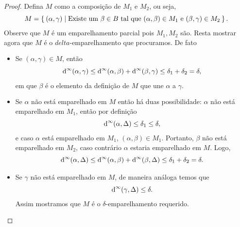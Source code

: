 \begin{proof}
    Defina $M$ como a composição de $M_1$ e $M_2$, ou seja,
    \begin{equation*}
        M = \Set{(\alpha, \gamma) | \text{Existe um } \beta \in B \text{ tal que }
        (\alpha, \beta) \in M_1 \text{ e } (\beta, \gamma) \in M_2}.
    \end{equation*}
    Observe que $M$ é um emparelhamento parcial pois $M_1, M_2$ são. Resta 
    mostrar agora que $M$ é o $delta$-emparelhamento que procuramos. De fato
    \begin{itemize}
        \item Se $(\alpha, \gamma) \in M$, então
        \begin{equation*}
            \text{d}^\infty(\alpha, \gamma) \leq \text{d}^\infty(\alpha, \beta) + \text{d}^\infty(\beta, \gamma) 
            \leq \delta_1 + \delta_2 = \delta,
        \end{equation*}
        em que $\beta$ é o elemento da definição de $M$ que une $\alpha$ a $\gamma$. 
        \item Se $\alpha$ não está emparelhado em $M$ então há duas possibilidade:
        $\alpha$ não está emparelhado em $M_1$, então por definição
        \begin{equation*}
            \text{d}^\infty(\alpha, \Delta) \leq \delta_1 \leq \delta,
        \end{equation*}
        e caso $\alpha$ está emparelhado em $M_1$, $(\alpha, \beta) \in M_1$. 
        Portanto, $\beta$ não está emparelhado em $M_2$, caso contrário $\alpha$ estaria 
        emparelhado em $M$. Logo, 
        \begin{equation*}
            \text{d}^\infty(\alpha, \Delta) \leq \text{d}^\infty(\alpha, \beta) + \text{d}^\infty(\beta, \Delta) 
            \leq \delta_1 + \delta_2 = \delta.
        \end{equation*}
        \item Se $\gamma$ não está emparelhado em $M$, de maneira análoga temos que 
        \begin{equation*}
            \text{d}^\infty(\gamma, \Delta) \leq \delta.
        \end{equation*}
        Assim mostramos que $M$ é o $\delta$-emparelhamento requerido. 
    \end{itemize}
\end{proof}

